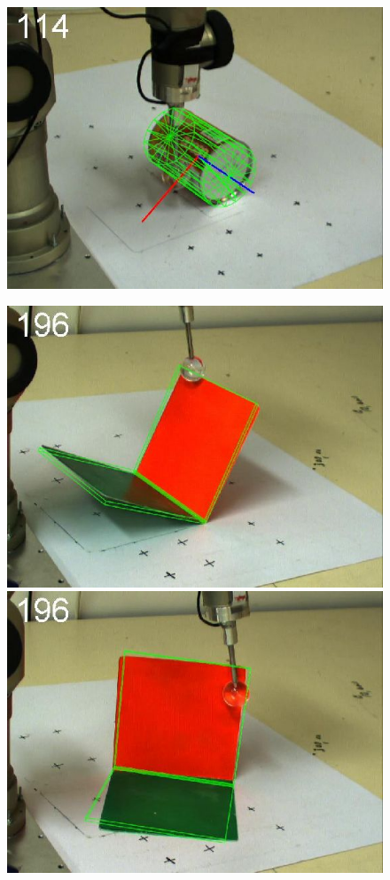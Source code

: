 \begin{figure}[htbp]
{\includegraphics[width=\imgAXwid]{images/A3_physx_39_2}
}
\centerline{
\includegraphics[width=\imgAXwid]{images/A1_2exp_667_3}
\includegraphics[width=\imgAXwid]{images/A1_2exp_876_3}
}
\end{figure}

